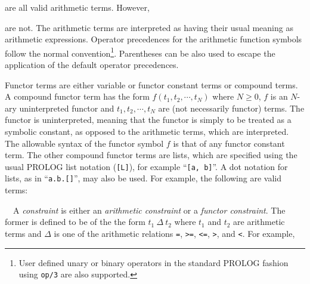 
\noindent
are all valid arithmetic terms. 
However, 


\noindent
are not.
The arithmetic terms are interpreted as having their usual meaning
as arithmetic expressions.
Operator precedences for the arithmetic
function symbols follow the normal convention\footnote{
User defined unary or binary operators in the standard PROLOG
fashion using {\tt op/3} are also supported.
}.
Parentheses can be also used to escape the application of
the default operator precedences.

Functor terms are either variable or functor 
constant terms or compound terms.
A compound functor term has the form
$f(t_1, t_2, \cdots , t_N)$ where $N \geq 0$, $f$ is
an $N$-ary uninterpreted functor and 
$t_1, t_2, \cdots , t_N$ are (not necessarily functor) terms.
The functor is uninterpreted, meaning that the functor
is simply to be treated as a symbolic constant,
as opposed to the arithmetic terms, which are interpreted.
The allowable syntax of the functor symbol $f$
is that of any functor constant term.
The other compound functor terms are lists, which are specified using
the usual PROLOG list notation ({\tt [L]}), for example ``{\tt [a, b]}''.
A dot notation for lists, as in ``{\tt a.b.[]}'', may also be used.
For example, the following are valid terms:


\noindent
~~A {\em constraint} is either an {\em arithmetic constraint} or
a {\em functor constraint}.  The former is defined to be of the
the form $t_1 ~\Delta~ t_2$ where $t_1$ and $t_2$ are arithmetic terms
and $\Delta$ is one of the arithmetic relations 
{\tt =}, {\tt >=}, {\tt <=}, {\tt >}, and {\tt <}.
For example, 

